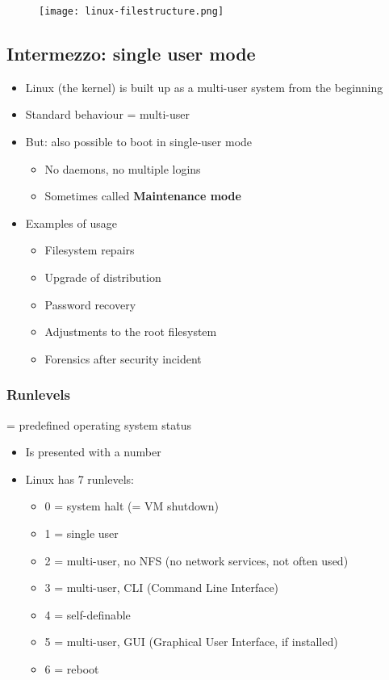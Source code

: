 \documentclass{article}
\begin{document}
\begin{figure}[H]
    \centering
    \texttt{[image: linux-filestructure.png]}
\end{figure}



\subsection{Intermezzo: single user mode}

\begin{itemize}
    \item Linux (the kernel) is built up as a multi-user system from the beginning
    \item Standard behaviour = multi-user
    \item But: also possible to boot in single-user mode
    \begin{itemize}
        \item No daemons, no multiple logins
        \item Sometimes called \textbf{Maintenance mode}
    \end{itemize}
    \item Examples of usage
    \begin{itemize}
        \item Filesystem repairs
        \item Upgrade of distribution
        \item Password recovery
        \item Adjustments to the root filesystem
        \item Forensics after security incident
    \end{itemize}
\end{itemize}

\subsubsection{Runlevels}

= predefined operating system status

\begin{itemize}
    \item Is presented with a number
    \item Linux has 7 runlevels:
    \begin{itemize}
        \item 0 = system halt (= VM shutdown)
        \item 1 = single user
        \item 2 = multi-user, no NFS (no network services, not often used)
        \item 3 = multi-user, CLI (Command Line Interface)
        \item 4 = self-definable
        \item 5 = multi-user, GUI (Graphical User Interface, if installed)
        \item 6 = reboot
    \end{itemize}
\end{itemize}
\end{document}
